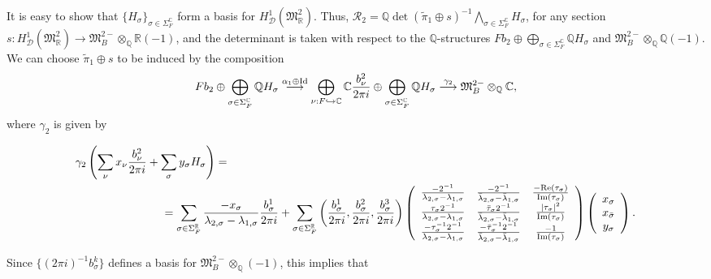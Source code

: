 \documentclass{amsart}
\theoremstyle{definition}
\theoremstyle{remark}
\numberwithin{equation}{section}
\newcommand{\mfM}{{\mathfrak M}}
\newcommand{\Q}{{\mathbb Q}}
\newcommand{\C}{{\mathbb C}}
\newcommand{\R}{{\mathbb R}}
\newcommand{\cR}{{\mathcal R}}
\newcommand{\cD}{{\mathcal D}}
\begin{document}
It is easy to show that $\{H_\sigma\}_{\sigma\in\Sigma_F^\C}$ form a basis for $H^1_{\cD}(\mfM^2_\R)$. Thus, 
$\cR_2=\Q\det(\tilde\pi_1\oplus s)^{-1}\bigwedge_{\sigma\in\Sigma_F^\C} H_\sigma$,  for any section $s:H^1_{\cD}(\mfM^2_\R)\rightarrow\mfM^{2-}_B\otimes_\Q\R(-1)$, and the determinant is taken with respect to the $\Q$-structures $Fb_2\oplus\bigoplus_{\sigma\in\Sigma_F^\C}\Q H_\sigma$ and $\mfM^{2-}_B\otimes_\Q\Q(-1)$. We can choose $\tilde\pi_1\oplus s$ to be induced by the composition
\[
F b_2\oplus \bigoplus_{\sigma\in\Sigma_F^\C}\Q H_\sigma\stackrel{\alpha_1\oplus{\rm Id}}{\longrightarrow}\bigoplus_{\nu:F\hookrightarrow\C}\C \frac{b_\nu^2}{2\pi i}\oplus\bigoplus_{\sigma\in\Sigma_F^\C}\Q H_\sigma\stackrel{\gamma_2}{\longrightarrow}\mfM^{2-}_B\otimes_\Q\C,
\]
where  $\gamma_2$ is given by
\begin{small}
\begin{eqnarray*}
\gamma_2\left(\sum_\nu x_\nu \frac{b^2_\nu}{2\pi i}+\sum_\sigma y_\sigma H_\sigma\right)=\qquad\qquad\qquad\qquad\qquad\qquad\qquad\qquad\qquad\qquad\qquad\qquad\qquad\qquad\qquad\qquad\qquad\qquad\\
 =\sum_{\sigma\in\Sigma_F^\R}\frac{-x_\sigma}{\lambda_{2,\sigma}-\lambda_{1,\sigma}} \frac{b^1_\sigma}{2\pi i}+\sum_{\sigma\in\Sigma_F^\R}\left(\frac{b^1_\sigma}{2\pi i},\frac{b^2_\sigma}{2\pi i},\frac{b^3_\sigma}{2\pi i}\right)\left(\begin{array}{ccc}
    \frac{-2^{-1}}{\lambda_{2,\sigma}-\lambda_{1,\sigma}} & \frac{-2^{-1}}{\bar\lambda_{2,\sigma}-\bar\lambda_{1,\sigma}} &\frac{-{\rm Re}(\tau_\sigma)}{{\rm Im}(\tau_\sigma)}\\
    \frac{\tau_\sigma2^{-1}}{\lambda_{2,\sigma}-\lambda_{1,\sigma}} &\frac{\bar\tau_\sigma2^{-1}}{\bar\lambda_{2,\sigma}-\bar\lambda_{1,\sigma}} &\frac{|\tau_\sigma|^2}{{\rm Im}(\tau_\sigma)}\\
    \frac{-\tau_\sigma^{-1}2^{-1}}{\lambda_{2,\sigma}-\lambda_{1,\sigma}}&\frac{-\bar\tau_\sigma^{-1}2^{-1}}{\bar\lambda_{2,\sigma}-\bar\lambda_{1,\sigma}}&\frac{-1}{{\rm Im}(\tau_\sigma)}
\end{array}\right)\left(\begin{array}{c}x_\sigma\\x_{\bar\sigma}\\y_\sigma\end{array}\right).
\end{eqnarray*}
\end{small}
Since $\{(2\pi i)^{-1}b_\sigma^k\}$ defines a basis for $\mfM^{2-}_B\otimes_\Q(-1)$, this implies that 
\end{document}

